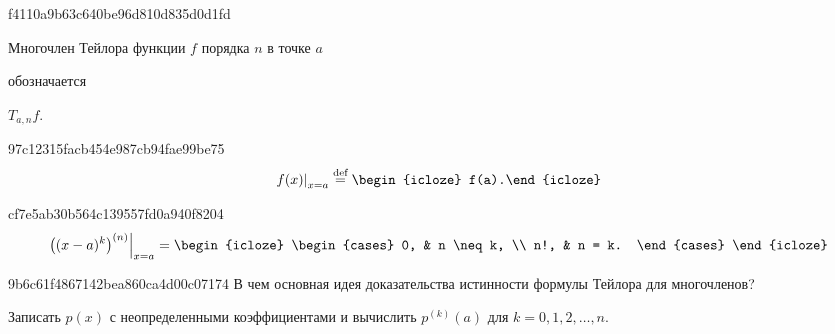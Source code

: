 \begin{note}{f4110a9b63c640be96d810d835d0d1fd}
    \begin{icloze}{2}Многочлен Тейлора функции \( f \) порядка \( n \) в точке \( a \)\end{icloze} обозначается \begin{icloze}{1}\( T_{a, n} f.  \)\end{icloze}
\end{note}


\begin{note}{97c12315facb454e987cb94fae99be75}
\[
    \left. f(x) \right|_{x = a} \overset{\text{def}}= \begin{icloze}{1}f(a).\end{icloze}
\]
\end{note}

\begin{note}{cf7e5ab30b564c139557fd0a940f8204}
    \[
        \left. \left((x - a)^{k} \right)^{(n)}  \right|_{x = a} =
        \begin{icloze}{1}
            \begin{cases}
                0, & n \neq k, \\
                n!, & n = k.
            \end{cases}
        \end{icloze}
    \]
\end{note}

\begin{note}{9b6c61f4867142bea860ca4d00c07174}
    В чем основная идея доказательства истинности формулы Тейлора для многочленов?

    \begin{cloze}{1}
        Записать \( p(x) \) с неопределенными коэффициентами и вычислить \( p^{(k)} (a) \) для \( k = 0, 1, 2, \ldots, n \).
    \end{cloze}
\end{note}

